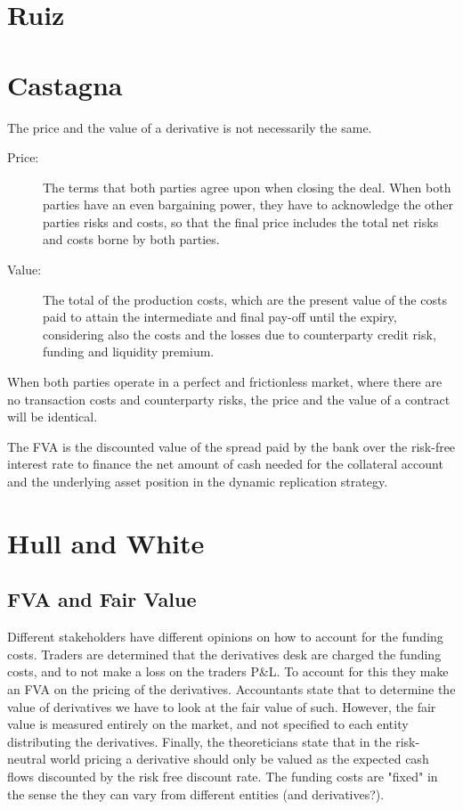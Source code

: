 \documentclass[10pt,a4paper]{article}
\begin{document}
     \section{Ruiz}

     \section{Castagna}
        The price and the value of a derivative is not necessarily the same.

        \begin{description}
            \item[Price:] The terms that both parties agree upon when closing the deal. When both parties have an even bargaining power, they have to acknowledge the other parties risks and costs, so that the final price includes the total net risks and costs borne by both parties.
            \item[Value:] The total of the production costs, which are the present value of the costs paid to attain the intermediate and final pay-off until the expiry, considering also the costs and the losses due to counterparty credit risk, funding and liquidity premium.
        \end{description}

        When both parties operate in a perfect and frictionless market, where there are no transaction costs and counterparty risks, the price and the value of a contract will be identical.

        The FVA is the discounted value of the spread paid by the bank over the risk-free interest rate to finance the net amount of cash needed for the collateral account and the underlying asset position in the dynamic replication strategy.

    \section{Hull and White}
    \subsection{FVA and Fair Value}
        Different stakeholders have different opinions on how to account for the funding costs. Traders are determined that the derivatives desk are charged the funding costs, and to not make a loss on the traders P\&L. To account for this they make an FVA on the pricing of the derivatives. Accountants state that to determine the value of derivatives we have to look at the fair value of such. However, the fair value is measured entirely on the market, and not specified to each entity distributing the derivatives. Finally, the theoreticians state that in the risk-neutral world pricing a derivative should only be valued as the expected cash flows discounted by the risk free discount rate. The funding costs are "fixed" in the sense the they can vary from different entities (and derivatives?).
\end{document}
